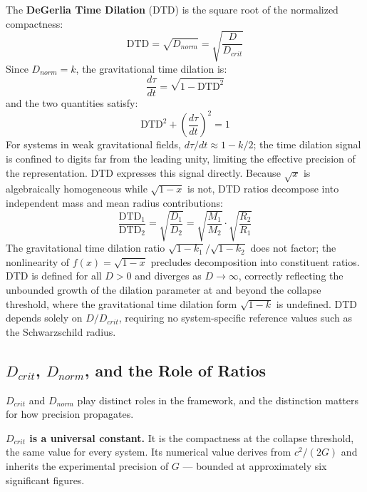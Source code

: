 \documentclass[twoside,twocolumn,9pt]{article}
\begin{document}
The \textbf{DeGerlia Time Dilation} (DTD) is the square root of the normalized compactness:
\begin{equation} \label{eq:dtd}
\text{DTD} = \sqrt{D_{norm}} = \sqrt{\frac{D}{D_{crit}}}
\end{equation}
Since $D_{norm} = k$, the gravitational time dilation is:
\begin{equation} \label{eq:gtd_dtd}
\frac{d\tau}{dt} = \sqrt{1 - \text{DTD}^2}
\end{equation}
and the two quantities satisfy:
\begin{equation} \label{eq:pythagorean}
\text{DTD}^2 + \left(\frac{d\tau}{dt}\right)^2 = 1
\end{equation}
For systems in weak gravitational fields, $d\tau/dt \approx 1 - k/2$; the time dilation signal is confined to digits far from the leading unity, limiting the effective precision of the representation. DTD expresses this signal directly. Because $\sqrt{x}$ is algebraically homogeneous while $\sqrt{1-x}$ is not, DTD ratios decompose into independent mass and mean radius contributions:
\begin{equation} \label{eq:dtd_ratio}
\frac{\text{DTD}_1}{\text{DTD}_2} = \sqrt{\frac{D_1}{D_2}} = \sqrt{\frac{M_1}{M_2}} \cdot \sqrt{\frac{R_2}{R_1}}
\end{equation}
The gravitational time dilation ratio $\sqrt{1-k_1}/\sqrt{1-k_2}$ does not factor; the nonlinearity of $f(x) = \sqrt{1-x}$ precludes decomposition into constituent ratios. DTD is defined for all $D > 0$ and diverges as $D \to \infty$, correctly reflecting the unbounded growth of the dilation parameter at and beyond the collapse threshold, where the gravitational time dilation form $\sqrt{1-k}$ is undefined. DTD depends solely on $D/D_{crit}$, requiring no system-specific reference values such as the Schwarzschild radius.

\subsection{$D_{crit}$, $D_{norm}$, and the Role of Ratios}

$D_{crit}$ and $D_{norm}$ play distinct roles in the framework, and the distinction matters for how precision propagates.

\textbf{$D_{crit}$ is a universal constant.} It is the compactness at the collapse threshold, the same value for every system. Its numerical value derives from $c^2/(2G)$ and inherits the experimental precision of $G$ — bounded at approximately six significant figures.
\end{document}
